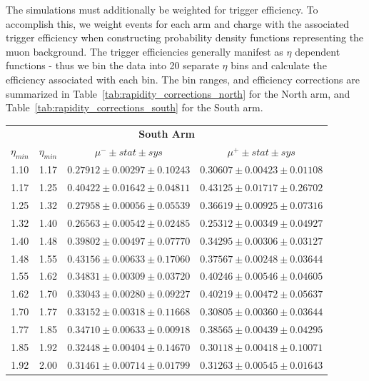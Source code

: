 The simulations must additionally be weighted for trigger efficiency. To
accomplish this, we weight events for each arm and charge with the associated
trigger efficiency when constructing probability density functions representing
the muon background. The trigger efficiencies generally manifest as $\eta$
dependent functions - thus we bin the data into 20 separate $\eta$ bins and
calculate the efficiency associated with each bin. The bin ranges, and
efficiency corrections are summarized in
Table~\ref{tab:rapidity_corrections_north} for the North arm, and
Table~\ref{tab:rapidity_corrections_south} for the South arm.
\begin{table}
  \centering
  \begin{tabular}{cccc}
    \toprule
    \multicolumn{4}{c}{\textbf{South Arm}} \\
    \textbf{$\eta_{min}$} & 
    \textbf{$\eta_{min}$} & 
    \textbf{$\mu^{-}\pm stat \pm sys$} & 
    \textbf{$\mu^{+}\pm stat \pm sys$} \\
    \midrule
    1.10 & 1.17 & $0.27912 \pm 0.00297 \pm 0.10243$ & $0.30607 \pm 0.00423 \pm 0.01108$ \\
    1.17 & 1.25 & $0.40422 \pm 0.01642 \pm 0.04811$ & $0.43125 \pm 0.01717 \pm 0.26702$ \\
    1.25 & 1.32 & $0.27958 \pm 0.00056 \pm 0.05539$ & $0.36619 \pm 0.00925 \pm 0.07316$ \\
    1.32 & 1.40 & $0.26563 \pm 0.00542 \pm 0.02485$ & $0.25312 \pm 0.00349 \pm 0.04927$ \\
    1.40 & 1.48 & $0.39802 \pm 0.00497 \pm 0.07770$ & $0.34295 \pm 0.00306 \pm 0.03127$ \\
    1.48 & 1.55 & $0.43156 \pm 0.00633 \pm 0.17060$ & $0.37567 \pm 0.00248 \pm 0.03644$ \\
    1.55 & 1.62 & $0.34831 \pm 0.00309 \pm 0.03720$ & $0.40246 \pm 0.00546 \pm 0.04605$ \\
    1.62 & 1.70 & $0.33043 \pm 0.00280 \pm 0.09227$ & $0.40219 \pm 0.00472 \pm 0.05637$ \\
    1.70 & 1.77 & $0.33152 \pm 0.00318 \pm 0.11668$ & $0.30805 \pm 0.00360 \pm 0.03644$ \\
    1.77 & 1.85 & $0.34710 \pm 0.00633 \pm 0.00918$ & $0.38565 \pm 0.00439 \pm 0.04295$ \\
    1.85 & 1.92 & $0.32448 \pm 0.00404 \pm 0.14670$ & $0.30118 \pm 0.00418 \pm 0.10071$ \\
    1.92 & 2.00 & $0.31461 \pm 0.00714 \pm 0.01799$ & $0.31263 \pm 0.00545 \pm 0.01643$ \\

\end{tabular}
\end{table}

